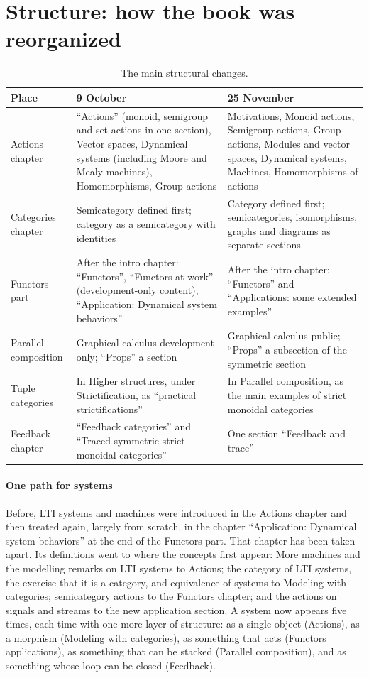 \documentclass[11pt,a4paper]{article}
\begin{document}
\section{Structure: how the book was reorganized}

\begin{table}[h]
\centering\small
\begin{tabularx}{\textwidth}{@{}P{33mm}LL@{}}
\toprule
\textbf{Place} & \textbf{9 October} & \textbf{25 November}\\
\midrule
Actions chapter & ``Actions'' (monoid, semigroup and set actions in one section), Vector spaces, Dynamical systems (including Moore and Mealy machines), Homomorphisms, Group actions
 & Motivations, Monoid actions, Semigroup actions, Group actions, Modules and vector spaces, Dynamical systems, Machines, Homomorphisms of actions\\
Categories chapter & Semicategory defined first; category as a semicategory with identities
 & Category defined first; semicategories, isomorphisms, graphs and diagrams as separate sections\\
Functors part & After the intro chapter: ``Functors'', ``Functors at work'' (development-only content), ``Application: Dynamical system behaviors''
 & After the intro chapter: ``Functors'' and ``Applications: some extended examples''\\
Parallel composition & Graphical calculus development-only; ``Props'' a section
 & Graphical calculus public; ``Props'' a subsection of the symmetric section\\
Tuple categories & In Higher structures, under Strictification, as ``practical strictifications''
 & In Parallel composition, as the main examples of strict monoidal categories\\
Feedback chapter & ``Feedback categories'' and ``Traced symmetric strict monoidal categories''
 & One section ``Feedback and trace''\\
\bottomrule
\end{tabularx}
\caption{The main structural changes.}
\end{table}

\paragraph{One path for systems} Before, LTI systems and machines were introduced in the Actions
chapter and then treated again, largely from scratch, in the chapter ``Application: Dynamical
system behaviors'' at the end of the Functors part. That chapter has been taken apart. Its
definitions went to where the concepts first appear: More machines and the modelling remarks on
LTI systems to Actions; the category of LTI systems, the exercise that it is a category, and
equivalence of systems to Modeling with categories; semicategory actions to the Functors chapter;
and the actions on signals and streams to the new application section. A system now appears five
times, each time with one more layer of structure: as a single object (Actions), as a morphism
(Modeling with categories), as something that acts (Functors applications), as something that can
be stacked (Parallel composition), and as something whose loop can be closed (Feedback).
\end{document}

